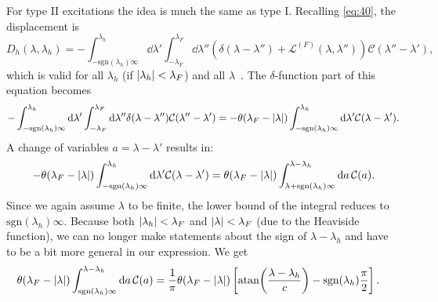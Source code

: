 \documentclass[11pt, a4paper]{report} %
\begin{document}
For type II excitations the idea is much the same as type I. Recalling \cref{eq:40}, the displacement is
\begin{equation}
	D_h(\lambda, \lambda_h) = - \int_{-\textrm{sgn}(\lambda_h)\infty}^{\lambda_h} \dd \lambda' \int_{-\lambda_F}^{\lambda_F} \dd \lambda'' \left(\delta(\lambda-\lambda'') + \mathcal{L}^{(F)}(\lambda,\lambda'') \right)\mathcal{C}(\lambda''-\lambda'),
\end{equation}
which is valid for all \(\lambda_h\) (if \(\abs{\lambda_h} < \lambda_F\)) and all \(\lambda\)~\cite{Caux2015}.
The \(\delta\)-function part of this equation becomes
\begin{align}
	-\int_{-\textrm{sgn}(\lambda_h)\infty}^{\lambda_h} \dd \lambda' \int_{-\lambda_F}^{\lambda_F} \dd \lambda'' \delta(\lambda-\lambda'') \mathcal{C}(\lambda''-\lambda') 
		= - \theta(\lambda_F - \abs{\lambda}) \int_{-\textrm{sgn}(\lambda_h)\infty}^{\lambda_h} \dd \lambda'     \mathcal{C}(\lambda-\lambda').
\end{align}
A change of variables \(a=\lambda-\lambda'\) results in:
\begin{align}
	 - \theta(\lambda_F - \abs{\lambda}) \int_{-\textrm{sgn}(\lambda_h)\infty}^{\lambda_h} \dd \lambda'     \mathcal{C}(\lambda-\lambda') = 
	  \theta(\lambda_F - \abs{\lambda}) \int_{\lambda+\textrm{sgn}(\lambda_h)\infty}^{\lambda-\lambda_h} \dd a \, \mathcal{C}(a).
\end{align}
Since we again assume \(\lambda\) to be finite, the lower bound of the integral reduces to \(\textrm{sgn}(\lambda_h)\infty\).
Because both \({\abs{\lambda_h} < \lambda_F}\) and \({\abs{\lambda} < \lambda_F}\) (due to the Heaviside function), we can no longer make statements about the sign of \(\lambda-\lambda_h\) and have to be a bit more general in our expression.
We get
\begin{align}
	  \theta(\lambda_F - \abs{\lambda}) \int_{\textrm{sgn}(\lambda_h)\infty}^{\lambda-\lambda_h} \dd a \, \mathcal{C}(a) 
	  &= \frac{1}{\pi}\theta(\lambda_F - \abs{\lambda}) \left[ \atan(\frac{\lambda-\lambda_h}{c}) - \textrm{sgn}(\lambda_h)\frac{\pi}{2}\right].
\end{align}
\end{document}
